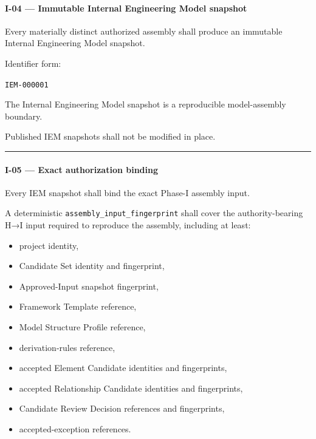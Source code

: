 \hypertarget{i-04--immutable-internal-engineering-model-snapshot}{%
\paragraph{I-04 --- Immutable Internal Engineering Model snapshot}\label{i-04--immutable-internal-engineering-model-snapshot}}

Every materially distinct authorized assembly shall produce an immutable Internal Engineering Model snapshot.

Identifier form:

\texttt{IEM-000001}

The Internal Engineering Model snapshot is a reproducible model-assembly boundary.

Published IEM snapshots shall not be modified in place.

\begin{center}\rule{0.5\linewidth}{0.5pt}\end{center}

\hypertarget{i-05--exact-authorization-binding}{%
\paragraph{I-05 --- Exact authorization binding}\label{i-05--exact-authorization-binding}}

Every IEM snapshot shall bind the exact Phase-I assembly input.

A deterministic \texttt{assembly\_input\_fingerprint} shall cover the authority-bearing H→I input required to reproduce the assembly, including at least:

\begin{itemize}
\tightlist
\item
  project identity,
\item
  Candidate Set identity and fingerprint,
\item
  Approved-Input snapshot fingerprint,
\item
  Framework Template reference,
\item
  Model Structure Profile reference,
\item
  derivation-rules reference,
\item
  accepted Element Candidate identities and fingerprints,
\item
  accepted Relationship Candidate identities and fingerprints,
\item
  Candidate Review Decision references and fingerprints,
\item
  accepted-exception references.
\end{itemize}

